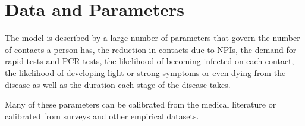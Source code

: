 \section{Data and Parameters}
\label{sec:data_and_parameters}

The model is described by a large number of parameters that govern the number of contacts
a person has, the reduction in contacts due to NPIs, the demand for rapid tests and PCR
tests, the likelihood of becoming infected on each contact, the likelihood of developing
light or strong symptoms or even dying from the disease as well as the duration each
stage of the disease takes.

Many of these parameters can be calibrated from the medical literature or calibrated from
surveys and other empirical datasets.














